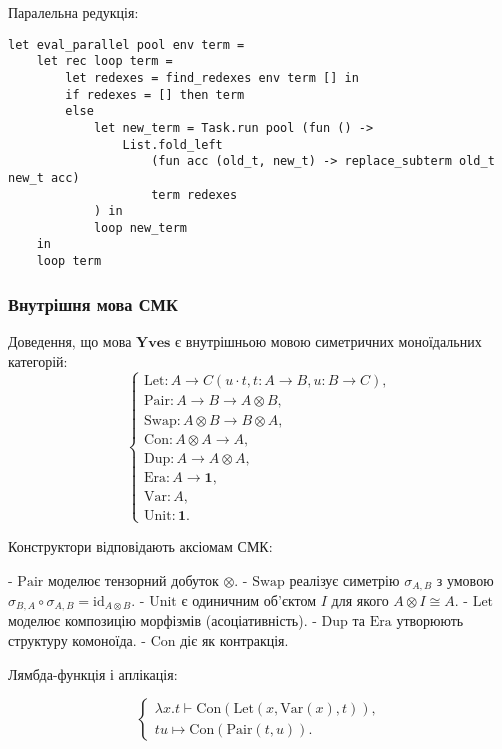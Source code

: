 \documentclass{article}
\begin{document}
\begin{definition}
Паралельна редукція:
\begin{lstlisting}[mathescape=true]
let eval_parallel pool env term =
    let rec loop term =
        let redexes = find_redexes env term [] in
        if redexes = [] then term
        else
            let new_term = Task.run pool (fun () ->
                List.fold_left
                    (fun acc (old_t, new_t) -> replace_subterm old_t new_t acc)
                    term redexes
            ) in
            loop new_term
    in
    loop term
\end{lstlisting}
\end{definition}

\subsubsection{Внутрішня мова СМК}

\begin{theorem}
Доведення, що мова $\mathbf{Yves}$ є внутрішньою мовою симетричних моноїдальних категорій:
\[
\begin{cases}
   \mathrm{Let} : A \to C (u \cdot t, t: A \to B, u: B \to C), \\
   \mathrm{Pair} : A \rightarrow B \rightarrow A \otimes B, \\
   \mathrm{Swap} : A \otimes B \rightarrow B \otimes A, \\
   \mathrm{Con} : A \otimes A \rightarrow A, \\
   \mathrm{Dup} : A \rightarrow A \otimes A, \\
   \mathrm{Era} : A \rightarrow \mathbf{1}, \\
   \mathrm{Var} : A, \\
   \mathrm{Unit} : \mathbf{1}.
\end{cases}
\]
\end{theorem}

Конструктори відповідають аксіомам СМК:

- $\mathrm{Pair}$ моделює тензорний добуток $\otimes$.
- $\mathrm{Swap}$ реалізує симетрію $\sigma_{A,B}$ з умовою $\sigma_{B,A} \circ \sigma_{A,B} = \mathrm{id}_{A \otimes B}$.
- $\mathrm{Unit}$ є одиничним об'єктом $I$ для якого $A \otimes I \cong A$.
- $\mathrm{Let}$ моделює композицію морфізмів (асоціативність).
- $\mathrm{Dup}$ та $\mathrm{Era}$ утворюють структуру комоноїда.
- $\mathrm{Con}$ діє як контракція.

Лямбда-функція і аплікація:

\[
\begin{cases}
  \lambda x.t \vdash \mathrm{Con}(\mathrm{Let}(x,\mathrm{Var}(x),t)), \\
  t u \mapsto \mathrm{Con}(\mathrm{Pair}(t,u)).
\end{cases}
\]
\end{document}
